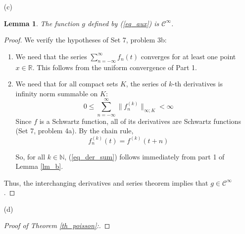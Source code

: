 \documentclass[12pt, reqno]{article}
\newtheorem{lemma}[theorem]{Lemma}
\theoremstyle{definition}
\theoremstyle{remark}
\begin{document}
\begin{itemize}
\vspace{0.1 cm}
\item[(c)] %

\begin{lemma} \label{lm_cinfty}
    The function $g$ defined by (\ref{eq_aux}) is $\mathcal{C}^\infty$.
\end{lemma}

\begin{proof}
    We verify the hypotheses of Set 7, problem 3b: 

    \begin{enumerate}
        \item We need that the series $\sum_{n=-\infty}^{\infty}f_{n}(t)$ converges for at least one point $x\in \mathbb{R}$. This follows from the uniform convergence of Part 1. 
        
        \item We need that for all compact sets $K$, the series of $k$-th derivatives is infinity norm summable on $K$: 
\begin{equation} \label{eq_der_sum}
0\le\sum_{n=-\infty}^{\infty}\|f_{n}^{(k)}\|_{\infty;K}<\infty
\end{equation}
Since $f$ is a Schwartz function, all of its derivatives are Schwartz functions (Set 7, problem 4a). By the chain rule, $$
f_{n}^{(k)}(t)=f^{(k)}(t+n)
$$

So, for all $k\in \mathbb{N}$, (\ref{eq_der_sum}) follows immediately from part 1 of Lemma \ref{lm_b}.

    \end{enumerate}
Thus, the interchanging derivatives and series theorem implies that $g\in\mathcal{C}^{\infty}$. 
\end{proof}

\vspace{0.1 cm}
\item[(d)] %

\begin{proof}[Proof of Theorem \ref{th_poisson}:]


\end{proof}
\end{itemize}
\end{document}

